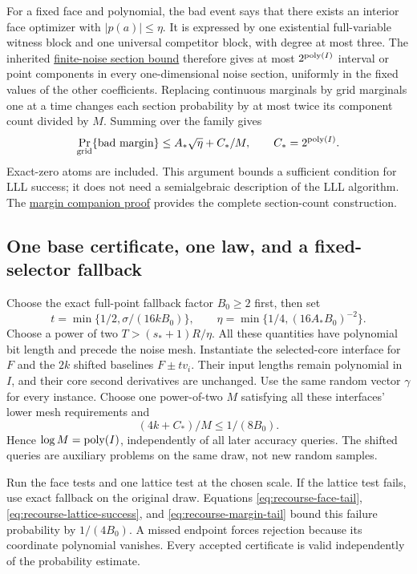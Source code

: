 For a fixed face and polynomial, the bad event says that there exists
an interior face optimizer with $|p(a)|\le\eta$. It is expressed by
one existential full-variable witness block and one universal
competitor block, with degree at most three. The inherited
\href{../../research-20261002/new-direction/polynomial-finite-noise-tails.md}{finite-noise section bound}
therefore gives at most $2^{\operatorname{poly}(I)}$ interval or point components
in every one-dimensional noise section, uniformly in the fixed values
of the other coefficients. Replacing continuous marginals by grid
marginals one at a time changes each section probability by at most
twice its component count divided by $M$. Summing over the family gives
\begin{equation}
 \Pr_{\rm grid}\{\text{bad margin}\}
 \le A_*\sqrt\eta+C_*/M,
 \qquad C_*=2^{\operatorname{poly}(I)}.
 \label{eq:recourse-margin-tail}
\end{equation}
Exact-zero atoms are included. This argument bounds a sufficient
condition for LLL success; it does not need a semialgebraic description
of the LLL algorithm. The
\href{../cubic-recourse/margin-tail.md}{margin companion proof}
provides the complete section-count construction.

\subsection{One base certificate, one law, and a fixed-selector fallback}

Choose the exact full-point fallback factor $B_0\ge2$ first, then set
\[
 t=\min\{1/2,\sigma/(16kB_0)\},\qquad
 \eta=\min\{1/4,(16A_*B_0)^{-2}\}.
\]
Choose a power of two $T>(s_*+1)R/\eta$. All these quantities have
polynomial bit length and precede the noise mesh. Instantiate the
selected-core interface for $F$ and the $2k$ shifted baselines
$F\pm t v_i$. Their input lengths remain polynomial in $I$, and their
core second derivatives are unchanged. Use the same random vector
$\gamma$ for every instance. Choose one power-of-two $M$ satisfying
all these interfaces' lower mesh requirements and
\[
 (4k+C_*)/M\le1/(8B_0).
\]
Hence $\log M=\operatorname{poly}(I)$, independently of all later accuracy queries.
The shifted queries are auxiliary problems on the same draw, not new
random samples.

Run the face tests and one lattice test at the chosen scale. If the
lattice test fails, use exact fallback on the original draw. Equations
\eqref{eq:recourse-face-tail}, \eqref{eq:recourse-lattice-success},
and \eqref{eq:recourse-margin-tail} bound this failure probability by
$1/(4B_0)$. A missed endpoint forces rejection because its coordinate
polynomial vanishes. Every accepted certificate is valid independently
of the probability estimate.

